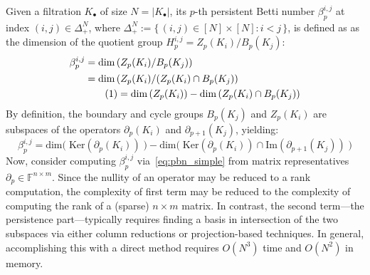 \documentclass[12pt]{article}
\numberwithin{equation}{section}
\newcommand{\+}{%
	\raisebox{0.18ex}{\scaleobj{0.55}{+}}
}
\theoremstyle{definition}
\newcommand\numberthis{\addtocounter{equation}{1}\tag{\theequation}}
\begin{document}
Given a filtration $K_\bullet$ of size $N = \lvert K_\bullet \rvert$, its $p$-th persistent Betti number $\beta_p^{i,j}$ at index $(i,j) \in \Delta_+^N$, where $\Delta_+^N  := \{ \, (i,j) \in [N] \times [N] : i < j \, \}$, is defined as as the dimension of the quotient group $H_p^{i,j} = Z_p(K_i) / B_p(K_j)$: 
\begin{align*} \label{eq:pbn}
	\centering
	\beta_p^{i,j} &= \mathrm{dim} \left ( Z_p(K_i) / B_p(K_j) \right ) \\
	& = \mathrm{dim} \left( Z_p(K_i) / (Z_p(K_i) \cap B_p(K_j) \right) \\
	& \numberthis = \mathrm{dim} \left( Z_p(K_i) \right) - \mathrm{dim}\left( Z_p(K_i) \cap B_p(K_j) \right ) 
\end{align*}
By definition, the boundary and cycle groups $B_p(K_j)$ and $Z_p(K_i)$ are subspaces of the operators $\partial_p(K_i)$ and $\partial_{p+1}(K_j)$, yielding: 
\begin{equation}\label{eq:pbn_simple}
	\beta_p^{i,j} = \mathrm{dim}\big( \; \mathrm{Ker}(\partial_p(K_i)) \; \big) - \mathrm{dim}\big( \; \mathrm{Ker}(\partial_p(K_i)) \cap \mathrm{Im}(\partial_{p+1}(K_j)) \; \big) 
\end{equation}
Now, consider computing $\beta_p^{i,j}$ via~\eqref{eq:pbn_simple} from matrix representatives $\partial_p \in \mathbb{F}^{n \times m}$.
Since the nullity of an operator may be reduced to a rank computation, the complexity of first term may be reduced to the complexity of computing the rank of a (sparse) $n \times m$ matrix. 
In contrast, the second term---the persistence part---typically requires finding a basis in intersection of the two subspaces via either column reductions or projection-based techniques. In general, accomplishing this with a direct method requires $O(N^3)$ time and $O(N^2)$ in memory.
\end{document}
